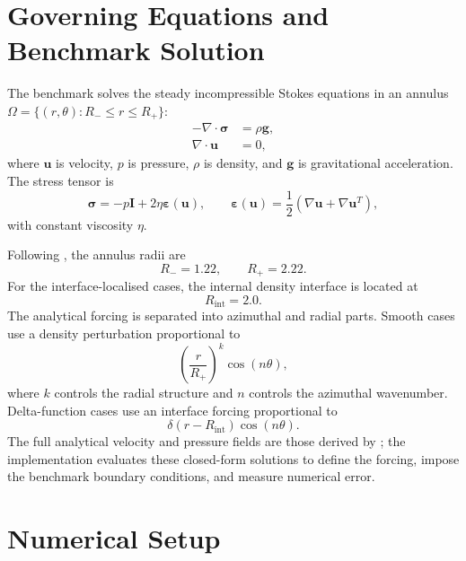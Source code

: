 \documentclass[gmd, manuscript]{copernicus}
\begin{document}
\section{Governing Equations and Benchmark Solution}

The benchmark solves the steady incompressible Stokes equations in an
annulus \(\Omega=\{(r,\theta):R_-\leq r\leq R_+\}\):
\begin{subequations}
\begin{align}
  -\nabla\cdot\boldsymbol{\sigma} &= \rho\mathbf{g}, \\
  \nabla\cdot\mathbf{u} &= 0,
\end{align}
\end{subequations}
where \(\mathbf{u}\) is velocity, \(p\) is pressure, \(\rho\) is density, and
\(\mathbf{g}\) is gravitational acceleration. The stress tensor is
\begin{equation}
  \boldsymbol{\sigma}
  =
  -p\mathbf{I}
  +2\eta\boldsymbol{\varepsilon}(\mathbf{u}),
  \qquad
  \boldsymbol{\varepsilon}(\mathbf{u})
  =
  \frac{1}{2}\left(\nabla\mathbf{u}+\nabla\mathbf{u}^{T}\right),
\end{equation}
with constant viscosity \(\eta\).

Following , the annulus radii are
\[
  R_- = 1.22,
  \qquad
  R_+ = 2.22.
\]
For the interface-localised cases, the internal density interface is located at
\[
  R_{\mathrm{int}} = 2.0.
\]
The analytical forcing is separated into azimuthal and radial parts. Smooth
cases use a density perturbation proportional to
\begin{equation}
  \left(\frac{r}{R_+}\right)^k\cos(n\theta),
\end{equation}
where \(k\) controls the radial structure and \(n\) controls the azimuthal
wavenumber. Delta-function cases use an interface forcing proportional to
\begin{equation}
  \delta(r-R_{\mathrm{int}})\cos(n\theta).
\end{equation}
The full analytical velocity and pressure fields are those derived by
; the  implementation evaluates these closed-form
solutions to define the forcing, impose the benchmark boundary conditions, and
measure numerical error.

\section{Numerical Setup}
\end{document}

